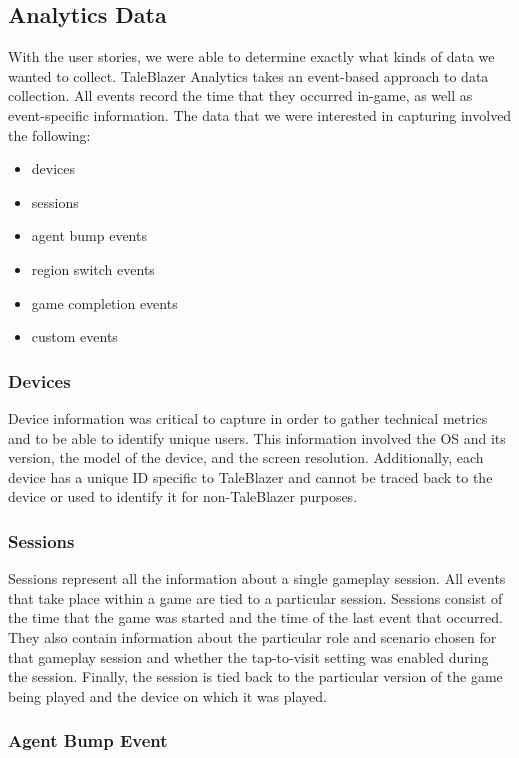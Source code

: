 \subsection{Analytics Data} 
\label{sec:analytics_data}

With the user stories, we were able to determine exactly what kinds of data we wanted to collect. TaleBlazer Analytics takes an event-based approach to data collection. All events record the time that they occurred in-game, as well as event-specific information. The data that we were interested in capturing involved the following:
	\begin{itemize}
		\item devices
		\item sessions
		\item agent bump events
		\item region switch events
		\item game completion events
		\item custom events
	\end{itemize}

\subsubsection{Devices}

Device information was critical to capture in order to gather technical metrics and to be able to identify unique users. This information involved the OS and its version, the model of the device, and the screen resolution. Additionally, each device has a unique ID specific to TaleBlazer and cannot be traced back to the device or used to identify it for non-TaleBlazer purposes.

\subsubsection{Sessions}

Sessions represent all the information about a single gameplay session. All events that take place within a game are tied to a particular session. Sessions consist of the time that the game was started and the time of the last event that occurred. They also contain information about the particular role and scenario chosen for that gameplay session and whether the tap-to-visit setting was enabled during the session. Finally, the session is tied back to the particular version of the game being played and the device on which it was played.

\subsubsection{Agent Bump Event}


